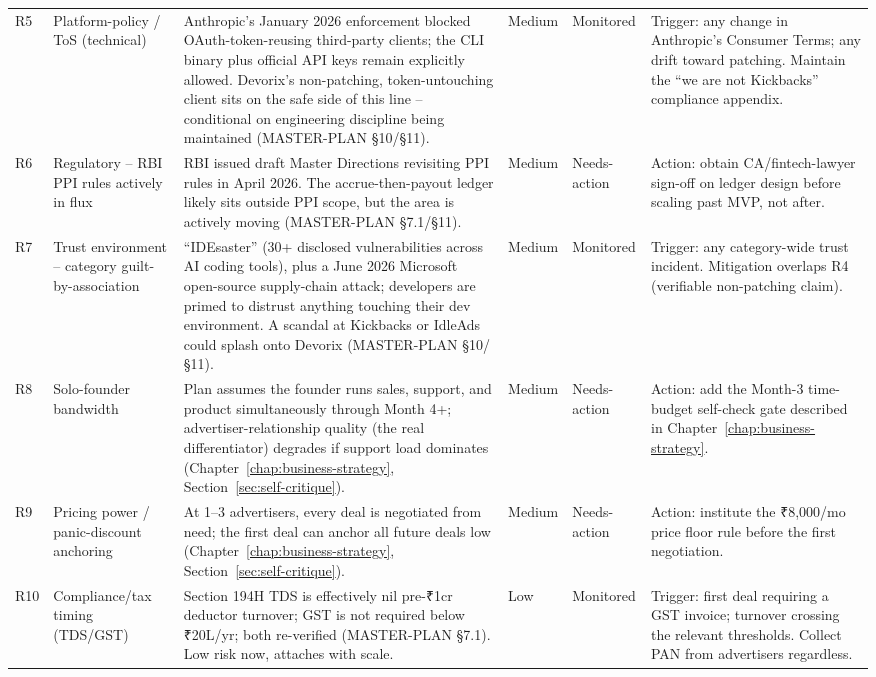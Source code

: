 \begin{longtable}{@{}p{0.6cm}p{3.6cm}p{4.6cm}p{1.5cm}p{1.7cm}p{3.6cm}@{}}
R5 & Platform-policy / ToS (technical) & Anthropic's January 2026 enforcement blocked OAuth-token-reusing third-party clients; the CLI binary plus official API keys remain explicitly allowed. Devorix's non-patching, token-untouching client sits on the safe side of this line -- conditional on engineering discipline being maintained (MASTER-PLAN \S10/\S11). & Medium & Monitored & Trigger: any change in Anthropic's Consumer Terms; any drift toward patching. Maintain the ``we are not Kickbacks'' compliance appendix. \\
R6 & Regulatory -- RBI PPI rules actively in flux & RBI issued draft Master Directions revisiting PPI rules in April 2026. The accrue-then-payout ledger likely sits outside PPI scope, but the area is actively moving (MASTER-PLAN \S7.1/\S11). & Medium & Needs-action & Action: obtain CA/fintech-lawyer sign-off on ledger design before scaling past MVP, not after. \\
R7 & Trust environment -- category guilt-by-association & ``IDEsaster'' (30+ disclosed vulnerabilities across AI coding tools), plus a June 2026 Microsoft open-source supply-chain attack; developers are primed to distrust anything touching their dev environment. A scandal at Kickbacks or IdleAds could splash onto Devorix (MASTER-PLAN \S10/\S11). & Medium & Monitored & Trigger: any category-wide trust incident. Mitigation overlaps R4 (verifiable non-patching claim). \\
R8 & Solo-founder bandwidth & Plan assumes the founder runs sales, support, and product simultaneously through Month 4+; advertiser-relationship quality (the real differentiator) degrades if support load dominates (Chapter~\ref{chap:business-strategy}, Section~\ref{sec:self-critique}). & Medium & Needs-action & Action: add the Month-3 time-budget self-check gate described in Chapter~\ref{chap:business-strategy}. \\
R9 & Pricing power / panic-discount anchoring & At 1--3 advertisers, every deal is negotiated from need; the first deal can anchor all future deals low (Chapter~\ref{chap:business-strategy}, Section~\ref{sec:self-critique}). & Medium & Needs-action & Action: institute the ₹8,000/mo price floor rule before the first negotiation. \\
R10 & Compliance/tax timing (TDS/GST) & Section 194H TDS is effectively nil pre-₹1cr deductor turnover; GST is not required below ₹20L/yr; both re-verified (MASTER-PLAN \S7.1). Low risk now, attaches with scale. & Low & Monitored & Trigger: first deal requiring a GST invoice; turnover crossing the relevant thresholds. Collect PAN from advertisers regardless. \\

\end{longtable}
